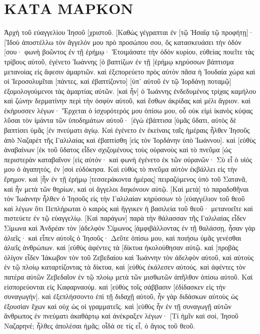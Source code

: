 \section{ΚΑΤΑ ΜΑΡΚΟΝ}
Ἀρχὴ τοῦ εὐαγγελίου Ἰησοῦ [χριστοῦ. 
[Καθὼς γέγραπται ἐν [τῷ Ἠσαΐᾳ τῷ προφήτῃ]· [Ἰδοὺ ἀποστέλλω τὸν ἄγγελόν μου πρὸ προσώπου σου, ὃς κατασκευάσει τὴν ὁδόν [σου· 
φωνὴ βοῶντος ἐν τῇ ἐρήμῳ· Ἑτοιμάσατε τὴν ὁδὸν κυρίου, εὐθείας ποιεῖτε τὰς τρίβους αὐτοῦ, 
ἐγένετο Ἰωάννης [ὁ βαπτίζων ἐν τῇ [ἐρήμῳ κηρύσσων βάπτισμα μετανοίας εἰς ἄφεσιν ἁμαρτιῶν. 
καὶ ἐξεπορεύετο πρὸς αὐτὸν πᾶσα ἡ Ἰουδαία χώρα καὶ οἱ Ἱεροσολυμῖται [πάντες, καὶ ἐβαπτίζοντο] [ὑπ᾽ αὐτοῦ ἐν τῷ Ἰορδάνῃ ποταμῷ] ἐξομολογούμενοι τὰς ἁμαρτίας αὐτῶν. 
[καὶ ἦν] ὁ Ἰωάννης ἐνδεδυμένος τρίχας καμήλου καὶ ζώνην δερματίνην περὶ τὴν ὀσφὺν αὐτοῦ, καὶ ἔσθων ἀκρίδας καὶ μέλι ἄγριον. 
καὶ ἐκήρυσσεν λέγων· Ἔρχεται ὁ ἰσχυρότερός μου ὀπίσω μου, οὗ οὐκ εἰμὶ ἱκανὸς κύψας λῦσαι τὸν ἱμάντα τῶν ὑποδημάτων αὐτοῦ· 
[ἐγὼ ἐβάπτισα [ὑμᾶς ὕδατι, αὐτὸς δὲ βαπτίσει ὑμᾶς [ἐν πνεύματι ἁγίῳ. 
Καὶ ἐγένετο ἐν ἐκείναις ταῖς ἡμέραις ἦλθεν Ἰησοῦς ἀπὸ Ναζαρὲτ τῆς Γαλιλαίας καὶ ἐβαπτίσθη [εἰς τὸν Ἰορδάνην ὑπὸ Ἰωάννου]. 
καὶ [εὐθὺς ἀναβαίνων [ἐκ τοῦ ὕδατος εἶδεν σχιζομένους τοὺς οὐρανοὺς καὶ τὸ πνεῦμα [ὡς περιστερὰν καταβαῖνον [εἰς αὐτόν· 
καὶ φωνὴ ἐγένετο ἐκ τῶν οὐρανῶν· Σὺ εἶ ὁ υἱός μου ὁ ἀγαπητός, ἐν [σοὶ εὐδόκησα. 
Καὶ εὐθὺς τὸ πνεῦμα αὐτὸν ἐκβάλλει εἰς τὴν ἔρημον. 
καὶ [ἦν ἐν τῇ ἐρήμῳ [τεσσεράκοντα ἡμέρας] πειραζόμενος ὑπὸ τοῦ Σατανᾶ, καὶ ἦν μετὰ τῶν θηρίων, καὶ οἱ ἄγγελοι διηκόνουν αὐτῷ. 
[Καὶ μετὰ] τὸ παραδοθῆναι τὸν Ἰωάννην ἦλθεν ὁ Ἰησοῦς εἰς τὴν Γαλιλαίαν κηρύσσων τὸ [εὐαγγέλιον τοῦ θεοῦ 
καὶ λέγων ὅτι Πεπλήρωται ὁ καιρὸς καὶ ἤγγικεν ἡ βασιλεία τοῦ θεοῦ· μετανοεῖτε καὶ πιστεύετε ἐν τῷ εὐαγγελίῳ. 
[Καὶ παράγων] παρὰ τὴν θάλασσαν τῆς Γαλιλαίας εἶδεν Σίμωνα καὶ Ἀνδρέαν τὸν [ἀδελφὸν Σίμωνος [ἀμφιβάλλοντας ἐν τῇ θαλάσσῃ, ἦσαν γὰρ ἁλιεῖς· 
καὶ εἶπεν αὐτοῖς ὁ Ἰησοῦς· Δεῦτε ὀπίσω μου, καὶ ποιήσω ὑμᾶς γενέσθαι ἁλιεῖς ἀνθρώπων. 
καὶ [εὐθὺς ἀφέντες τὰ [δίκτυα ἠκολούθησαν αὐτῷ. 
καὶ [προβὰς ὀλίγον εἶδεν Ἰάκωβον τὸν τοῦ Ζεβεδαίου καὶ Ἰωάννην τὸν ἀδελφὸν αὐτοῦ, καὶ αὐτοὺς ἐν τῷ πλοίῳ καταρτίζοντας τὰ δίκτυα, 
καὶ [εὐθὺς ἐκάλεσεν αὐτούς. καὶ ἀφέντες τὸν πατέρα αὐτῶν Ζεβεδαῖον ἐν τῷ πλοίῳ μετὰ τῶν μισθωτῶν ἀπῆλθον ὀπίσω αὐτοῦ. 
Καὶ εἰσπορεύονται εἰς Καφαρναούμ. καὶ [εὐθὺς τοῖς σάββασιν [ἐδίδασκεν εἰς τὴν συναγωγήν]. 
καὶ ἐξεπλήσσοντο ἐπὶ τῇ διδαχῇ αὐτοῦ, ἦν γὰρ διδάσκων αὐτοὺς ὡς ἐξουσίαν ἔχων καὶ οὐχ ὡς οἱ γραμματεῖς. 
καὶ [εὐθὺς ἦν ἐν τῇ συναγωγῇ αὐτῶν ἄνθρωπος ἐν πνεύματι ἀκαθάρτῳ καὶ ἀνέκραξεν 
λέγων· [Τί ἡμῖν καὶ σοί, Ἰησοῦ Ναζαρηνέ; ἦλθες ἀπολέσαι ἡμᾶς; οἶδά σε τίς εἶ, ὁ ἅγιος τοῦ θεοῦ. 
